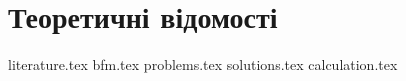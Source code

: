 \chapter{Теоретичні відомості}
{literature.tex}
{bfm.tex}
{problems.tex}
{solutions.tex}
{calculation.tex}
